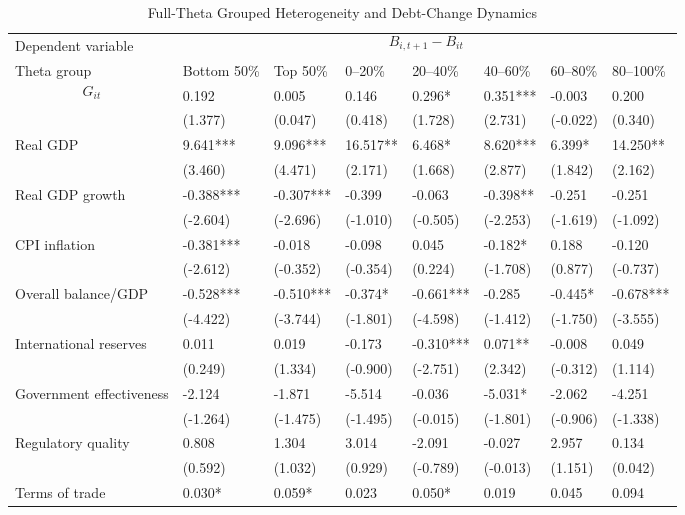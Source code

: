 \begin{table}[H]\centering
\begin{threeparttable}
\caption{Full-Theta Grouped Heterogeneity and Debt-Change Dynamics}
\label{tab:theta_group_heterogeneity_debt}
\scriptsize
\begin{tabularx}{\textwidth}{lYYYYYYY}
\toprule
Dependent variable &  \\
\cmidrule(lr){2-8}
Theta group & Bottom 50\% & Top 50\% & 0--20\% & 20--40\% & 40--60\% & 60--80\% & 80--100\% \\
\midrule
$$G_{it}$$ & 0.192 & 0.005 & 0.146 & 0.296* & 0.351*** & -0.003 & 0.200 \\
  & (1.377) & (0.047) & (0.418) & (1.728) & (2.731) & (-0.022) & (0.340) \\
Real GDP & 9.641*** & 9.096*** & 16.517** & 6.468* & 8.620*** & 6.399* & 14.250** \\
  & (3.460) & (4.471) & (2.171) & (1.668) & (2.877) & (1.842) & (2.162) \\
Real GDP growth & -0.388*** & -0.307*** & -0.399 & -0.063 & -0.398** & -0.251 & -0.251 \\
  & (-2.604) & (-2.696) & (-1.010) & (-0.505) & (-2.253) & (-1.619) & (-1.092) \\
CPI inflation & -0.381*** & -0.018 & -0.098 & 0.045 & -0.182* & 0.188 & -0.120 \\
  & (-2.612) & (-0.352) & (-0.354) & (0.224) & (-1.708) & (0.877) & (-0.737) \\
Overall balance/GDP & -0.528*** & -0.510*** & -0.374* & -0.661*** & -0.285 & -0.445* & -0.678*** \\
  & (-4.422) & (-3.744) & (-1.801) & (-4.598) & (-1.412) & (-1.750) & (-3.555) \\
International reserves & 0.011 & 0.019 & -0.173 & -0.310*** & 0.071** & -0.008 & 0.049 \\
  & (0.249) & (1.334) & (-0.900) & (-2.751) & (2.342) & (-0.312) & (1.114) \\
Government effectiveness & -2.124 & -1.871 & -5.514 & -0.036 & -5.031* & -2.062 & -4.251 \\
  & (-1.264) & (-1.475) & (-1.495) & (-0.015) & (-1.801) & (-0.906) & (-1.338) \\
Regulatory quality & 0.808 & 1.304 & 3.014 & -2.091 & -0.027 & 2.957 & 0.134 \\
  & (0.592) & (1.032) & (0.929) & (-0.789) & (-0.013) & (1.151) & (0.042) \\
Terms of trade & 0.030* & 0.059* & 0.023 & 0.050* & 0.019 & 0.045 & 0.094 \\

\end{tabularx}
\end{threeparttable}
\end{table}
